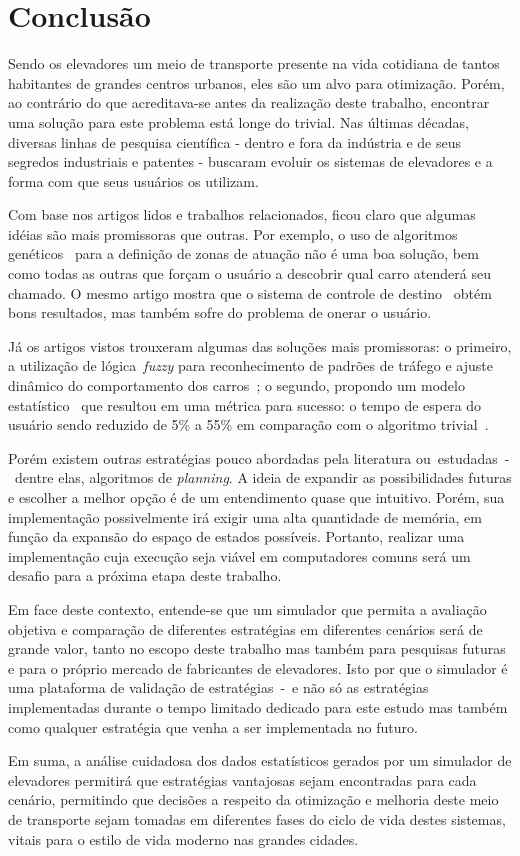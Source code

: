 \chapter{\label{chap:conclusion}Conclusão}

Sendo os elevadores um meio de transporte presente na vida cotidiana de tantos
habitantes de grandes centros urbanos, eles são um alvo para otimização. Porém,
ao contrário do que acreditava-se antes da realização deste trabalho, encontrar
uma solução para este problema está longe do trivial. Nas últimas décadas,
diversas linhas de pesquisa científica - dentro e fora da indústria e de seus
segredos industriais e patentes - buscaram evoluir os sistemas de elevadores e a
forma com que seus usuários os utilizam.

Com base nos artigos lidos e trabalhos relacionados, ficou claro que algumas
idéias são mais promissoras que outras. Por exemplo, o uso de algoritmos
genéticos~\cite{KOEHLEROTTIGER02} para a definição de zonas de atuação não é uma
boa solução, bem como todas as outras que forçam o usuário a descobrir qual
carro atenderá seu chamado. O mesmo artigo mostra que o sistema de controle de
destino~\cite{KOEHLEROTTIGER02} obtém bons resultados, mas também sofre do
problema de onerar o usuário.

Já os artigos vistos trouxeram algumas das soluções mais promissoras: o
primeiro, a utilização de lógica~\textit{fuzzy} para reconhecimento de padrões
de tráfego e ajuste dinâmico do comportamento dos carros~\cite{marja97}; o
segundo, propondo um modelo estatístico~\cite{DBLP:journals/corr/abs-1212-2499}
que resultou em uma métrica para sucesso: o tempo de espera do usuário sendo
reduzido de 5\% a 55\% em comparação com o algoritmo
trivial~\cite{DBLP:journals/corr/abs-1212-2499}.

Porém existem outras estratégias pouco abordadas pela literatura
ou~estudadas~-~dentre elas, algoritmos de \textit{planning}. A ideia de expandir
as possibilidades futuras e escolher a melhor opção é de um entendimento quase
que intuitivo. Porém, sua implementação possivelmente irá exigir uma alta
quantidade de memória, em função da expansão do espaço de estados possíveis.
Portanto, realizar uma implementação cuja execução seja viável em computadores
comuns será um desafio para a próxima etapa deste trabalho.

Em face deste contexto, entende-se que um simulador que permita a avaliação
objetiva e comparação de diferentes estratégias em diferentes cenários será de
grande valor, tanto no escopo deste trabalho mas também para pesquisas futuras e
para o próprio mercado de fabricantes de elevadores. Isto por que o simulador é
uma plataforma de validação de estratégias~-~e não só as estratégias
implementadas durante o tempo limitado dedicado para este estudo mas também como
qualquer estratégia que venha a ser implementada no futuro.

Em suma, a análise cuidadosa dos dados estatísticos gerados por um simulador de
elevadores permitirá que estratégias vantajosas sejam encontradas para cada
cenário, permitindo que decisões a respeito da otimização e melhoria deste meio
de transporte sejam tomadas em diferentes fases do ciclo de vida destes
sistemas, vitais para o estilo de vida moderno nas grandes cidades.
